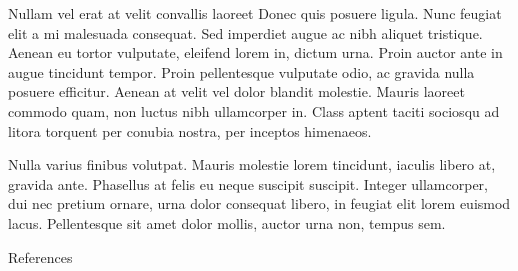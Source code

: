 \documentclass[final]{beamer}
\newlength{\sepwidth}
\newcommand{\separatorcolumn}{\begin{column}{\sepwidth}\end{column}}
\begin{document}
\begin{frame}[label={sec:orgd60d47b}]{}
\begin{columns}
\begin{column}{0.3\columnwidth}
\begin{block}{Nullam vel erat at velit convallis laoreet}
Donec quis posuere ligula. Nunc feugiat elit a mi malesuada consequat. Sed
imperdiet augue ac nibh aliquet tristique. Aenean eu tortor vulputate, eleifend
lorem in, dictum urna. Proin auctor ante in augue tincidunt tempor. Proin
pellentesque vulputate odio, ac gravida nulla posuere efficitur. Aenean at velit
vel dolor blandit molestie. Mauris laoreet commodo quam, non luctus nibh
ullamcorper in. Class aptent taciti sociosqu ad litora torquent per conubia
nostra, per inceptos himenaeos.

Nulla varius finibus volutpat. Mauris molestie lorem tincidunt, iaculis libero
at, gravida ante. Phasellus at felis eu neque suscipit suscipit.  Integer
ullamcorper, dui nec pretium ornare, urna dolor consequat libero, in feugiat
elit lorem euismod lacus. Pellentesque sit amet dolor mollis, auctor urna non,
tempus sem.
\end{block}

\begin{block}{References}
\nocite{*}
\footnotesize{}

\end{block}
\end{column}
\end{columns}
\end{frame}
\end{document}
